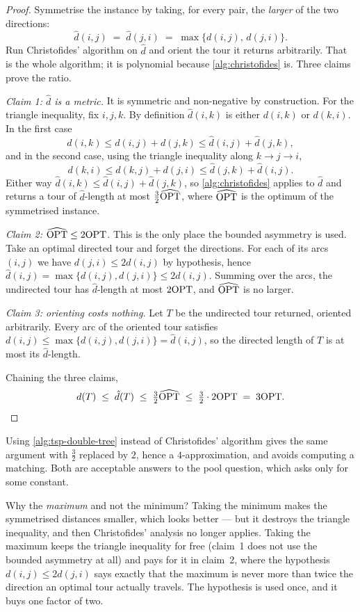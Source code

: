 \begin{proof}
Symmetrise the instance by taking, for every pair, the \emph{larger} of the two
directions:
\[ \hat d(i,j) \;=\; \hat d(j,i) \;=\; \max\{d(i,j),\, d(j,i)\}. \]
Run Christofides' algorithm on $\hat d$ and orient the tour it returns
arbitrarily. That is the whole algorithm; it is polynomial because
\cref{alg:christofides} is. Three claims prove the ratio.

\emph{Claim 1: $\hat d$ is a metric.} It is symmetric and non-negative by
construction. For the triangle inequality, fix $i,j,k$. By definition
$\hat d(i,k)$ is either $d(i,k)$ or $d(k,i)$. In the first case
\[ d(i,k) \le d(i,j) + d(j,k) \le \hat d(i,j) + \hat d(j,k), \]
and in the second case, using the triangle inequality along $k \to j \to i$,
\[ d(k,i) \le d(k,j) + d(j,i) \le \hat d(j,k) + \hat d(i,j). \]
Either way $\hat d(i,k) \le \hat d(i,j) + \hat d(j,k)$, so
\cref{alg:christofides} applies to $\hat d$ and returns a tour of $\hat
d$-length at most $\tfrac32 \widehat{\mathrm{OPT}}$, where $\widehat{\mathrm{OPT}}$ is the
optimum of the symmetrised instance.

\emph{Claim 2: $\widehat{\mathrm{OPT}} \le 2\mathrm{OPT}$.} This is the only place the bounded
asymmetry is used. Take an optimal directed tour and forget the directions. For
each of its arcs $(i,j)$ we have $d(j,i) \le 2 d(i,j)$ by hypothesis, hence
$\hat d(i,j) = \max\{d(i,j),d(j,i)\} \le 2 d(i,j)$. Summing over the arcs, the
undirected tour has $\hat d$-length at most $2\mathrm{OPT}$, and $\widehat{\mathrm{OPT}}$ is no
larger.

\emph{Claim 3: orienting costs nothing.} Let $T$ be the undirected tour
returned, oriented arbitrarily. Every arc of the oriented tour satisfies
$d(i,j) \le \max\{d(i,j),d(j,i)\} = \hat d(i,j)$, so the directed length of $T$
is at most its $\hat d$-length.

Chaining the three claims,
\[ d(T) \;\le\; \hat d(T) \;\le\; \tfrac32 \widehat{\mathrm{OPT}}
        \;\le\; \tfrac32 \cdot 2\mathrm{OPT} \;=\; 3\mathrm{OPT}. \qedhere \]
\end{proof}

Using \cref{alg:tsp-double-tree} instead of Christofides' algorithm gives the
same argument with $\tfrac32$ replaced by $2$, hence a $4$-approximation, and
avoids computing a matching. Both are acceptable answers to the pool question,
which asks only for some constant.

\begin{intuition}
Why the \emph{maximum} and not the minimum? Taking the minimum makes the
symmetrised distances smaller, which looks better --- but it destroys the
triangle inequality, and then Christofides' analysis no longer applies. Taking
the maximum keeps the triangle inequality for free (claim~1 does not use the
bounded asymmetry at all) and pays for it in claim~2, where the hypothesis
$d(i,j) \le 2 d(j,i)$ says exactly that the maximum is never more than twice
the direction an optimal tour actually travels. The hypothesis is used once,
and it buys one factor of two.
\end{intuition}

